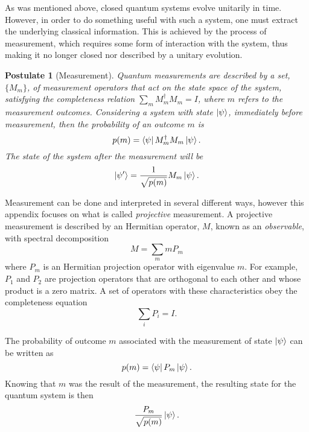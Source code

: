 \documentclass[../../../dissertation.tex]{subfiles}
\newtheorem{post}{Postulate}
\begin{document}
As was mentioned above, closed quantum systems evolve unitarily in time.
However, in order to do something useful with such a system, one must extract
the underlying classical information. This is achieved
by the process of measurement, which requires some form of interaction with the
system, thus making it no longer closed nor described by a unitary evolution.

\begin{post}[Measurement]
Quantum measurements are described by a set, $\{M_m\}$, of measurement operators
that act on the state space of the system, satisfying the completeness relation
$\sum_m M_m^\dag M_m = I$, where $m$ refers to the measurement outcomes. Considering a system with state $\ket{\psi}$, immediately before
measurement, then the probability of an outcome $m$ is \begin{equation}
	p(m) = \bra{\psi} M_m^\dag M_m \ket{\psi}.
\end{equation}
The state of the system after the measurement will be
\begin{equation}
\ket{\psi'} = \frac{1}{\sqrt{p(m)}} M_m \ket{\psi}.
\end{equation}
\end{post}\par
Measurement can be done and interpreted in several different ways, however this
appendix focuses on what is called \textit{projective} measurement. A projective
measurement is described by an Hermitian operator, $M$, known as an
\textit{observable}, with spectral decomposition
\begin{equation}
	M = \sum_m m P_m
\end{equation}
where $P_m$ is an Hermitian projection operator with eigenvalue $m$. For
example, $P_1$ and $P_2$ are projection operators that are orthogonal to each
other and whose product is a zero matrix. A set of operators with these
characteristics obey the completeness equation 
\begin{equation}
	\sum_i P_i = I.
\end{equation}\par
The probability of outcome $m$ associated with the measurement of state
$\ket{\psi}$ can be written as 
\begin{equation}
	p(m) = \bra{\psi} P_m \ket{\psi}.
\end{equation}
Knowing that $m$ was the result of the measurement, the resulting state for the
quantum system is then
\begin{equation}
	\frac{P_m}{\sqrt{p(m)}} \ket{\psi}.
\end{equation}\par
\end{document}
